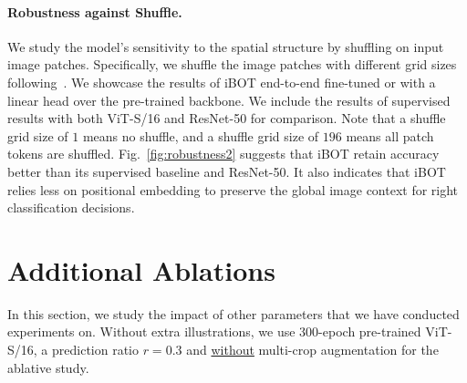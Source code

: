 \documentclass{article} %
\def\ourmethod{{iBOT}\xspace}
\begin{document}
\paragraph{Robustness against Shuffle.}
We study the model's sensitivity to the spatial structure by shuffling on input image patches. 
Specifically, we shuffle the image patches with different grid sizes following~\citep{intrig}. 
We showcase the results of \ourmethod end-to-end fine-tuned or with a linear head over the pre-trained backbone. We include the results of supervised results with both ViT-S/16 and ResNet-50 for comparison.
Note that a shuffle grid size of $1$ means no shuffle, and a shuffle grid size of $196$ means all patch tokens are shuffled.
Fig.~\ref{fig:robustness2} suggests that \ourmethod retain accuracy better than its supervised baseline and ResNet-50.
It also indicates that \ourmethod relies less on positional embedding to preserve the global image context for right classification decisions. 


\section{Additional Ablations}
\label{sec:addablation}

In this section, we study the impact of other parameters that we have conducted experiments on. Without extra illustrations, we use $300$-epoch pre-trained ViT-S/16, a prediction ratio $r=0.3$ and \underline{without} multi-crop augmentation for the ablative study. 
\end{document}
